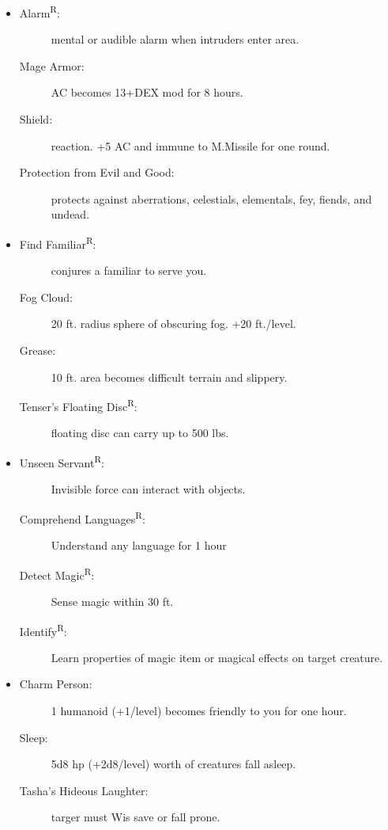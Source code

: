\documentclass[DIV=14, paper=a4, fontsize=10pt, twocolumn, twoside]{scrartcl}
\begin{document}
\begin{itemize}[align=parleft,labelwidth=1cm]
	\renewcommand{\labelitemi}{Abjur}\item
	\begin{description}
\item[Alarm\textsuperscript{R}:] mental or audible alarm when intruders enter area.
\item[Mage Armor:] AC becomes 13+DEX mod for 8 hours.
\item[Shield:] reaction. +5 AC and immune to M.Missile for one round.
\item[Protection from Evil and Good:] protects against aberrations, celestials, elementals, fey, fiends, and undead.
	\end{description}
	\renewcommand{\labelitemi}{Conj}\item
	\begin{description}
\item[Find Familiar\textsuperscript{R}:] conjures a familiar to serve you.
\item[Fog Cloud:] 20 ft. radius sphere of obscuring fog. +20 ft./level.
\item[Grease:] 10 ft. area becomes difficult terrain and slippery.
\item[Tenser’s Floating Disc\textsuperscript{R}:] floating disc can carry up to 500 lbs.
	\end{description}
	\renewcommand{\labelitemi}{Div}\item
	\begin{description}
\item[Unseen Servant\textsuperscript{R}:] Invisible force can interact with objects.
\item[Comprehend Languages\textsuperscript{R}:] Understand any language for 1 hour
\item[Detect Magic\textsuperscript{R}:] Sense magic within 30 ft.
\item[Identify\textsuperscript{R}:] Learn properties of magic item or magical effects on
target creature.	
	\end{description}
	\renewcommand{\labelitemi}{Ench}\item
	\begin{description}
\item[Charm Person:] 1 humanoid (+1/level) becomes friendly to you
for one hour.
\item[Sleep:] 5d8 hp (+2d8/level) worth of creatures fall asleep.
\item[Tasha’s Hideous Laughter:] targer must Wis save or fall prone.

\end{description}
\end{itemize}
\end{document}
